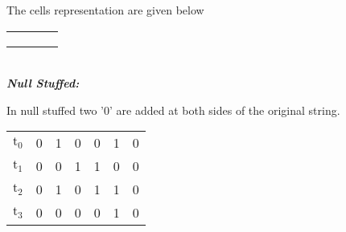 \documentclass[a4]{article}
\begin{document}
	\vspace*{0.2cm}
	The cells representation are given below 
	\vspace*{0.2cm}
	
	\begin{center}
		\begin{tabular}{|l|l|l|l|}
			\hline
			\cellcolor{black!40}\hspace*{0.9cm}&\hspace*{0.9cm} &\hspace*{0.9cm}&\cellcolor{black!40}\hspace*{0.9cm}\\
			\hline\cellcolor{black!40}&\cellcolor{black!40}& \cellcolor{black!40}&\\
			\hline&\cellcolor{black!40}&\cellcolor{black!40}& \\
			\hline\cellcolor{black!40}& &\cellcolor{black!40}&\cellcolor{black!40} \\
			\hline
		\end{tabular}
	\end{center}
	\vspace*{0.2cm}\\
	\large{\textbf{\textit{Null Stuffed:}}}
	
	In null stuffed two '0' are added at both sides of the original string.
	\vspace*{0.2cm}
	
	\begin{center}
		\begin{tabular}{ccccccc}
			\hline 
			$\mathrm{t}_{0}$\hspace*{0.7cm}& 0\hspace*{0.7cm}& 1\hspace*{0.7cm}& 0\hspace*{0.7cm}& 0\hspace*{0.7cm}& 1\hspace*{0.7cm}& 0\\
			$\mathrm{t}_{1}$\hspace*{0.7cm}& 0\hspace*{0.7cm}& 0\hspace*{0.7cm}& 1\hspace*{0.7cm}& 1\hspace*{0.7cm}& 0\hspace*{0.7cm}& 0\\
			$\mathrm{t}_{2}$\hspace*{0.7cm}& 0\hspace*{0.7cm}& 1\hspace*{0.7cm}& 0\hspace*{0.7cm}& 1\hspace*{0.7cm}& 1\hspace*{0.7cm}& 0\\
			$\mathrm{t}_{3}$\hspace*{0.7cm}& 0\hspace*{0.7cm}& 0\hspace*{0.7cm}& 0\hspace*{0.7cm}& 0\hspace*{0.7cm}& 1\hspace*{0.7cm}& 0\\
			\hline
		\end{tabular}
	\end{center}
	
\end{document}
